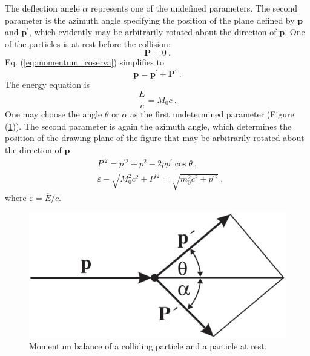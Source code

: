 \documentclass[11pt,a4paper]{article}
\renewcommand{\vec}[1]{\boldsymbol{#1}}
\begin{document}
The deflection angle $\alpha$ represents one of the undefined parameters. The second parameter is the azimuth angle specifying the position of the plane defined by $\vec{p}$ and $\vec{p}^\prime$, which evidently may be arbitrarily rotated about the direction of $\vec{p}$.  One of the particles is at rest before the collision:
\begin{equation}
\vec{P} = 0 ~.
\end{equation}
Eq. (\ref{eq:momentum_coserva}) simplifies to 
\begin{equation}
\vec{p} = \vec{p}^\prime +\vec{P}^\prime ~.
\end{equation}
The energy equation is
\begin{equation}
\dfrac{E}{c} = M_0 c ~.
\end{equation}
One may choose the angle $\theta$ or $\alpha$ as the first undetermined parameter (Figure (\ref{fig:Momentum_balance})). The second parameter is again the azimuth angle, which determines the position of the drawing plane of the figure that may be arbitrarily rotated about the direction of $\vec{p}$.
\begin{align}
& P^{\prime 2} = p^{\prime 2} +p^2 -2 p p^\prime \cos \theta ~, \\
& \varepsilon - \sqrt{M_0^2 c^2 +P^{\prime 2} } = \sqrt{m_0^2 c^2 +p^{\prime 2} } ~,
\end{align}
where $\varepsilon = \overline{E}/c$.

\begin{figure}
\centering
\includegraphics[height=5.cm, angle=0]{Momentum_balance.eps}
\caption{
Momentum balance of a colliding particle and a particle at rest.
}
\label{fig:Momentum_balance}
\end{figure}
\end{document}
